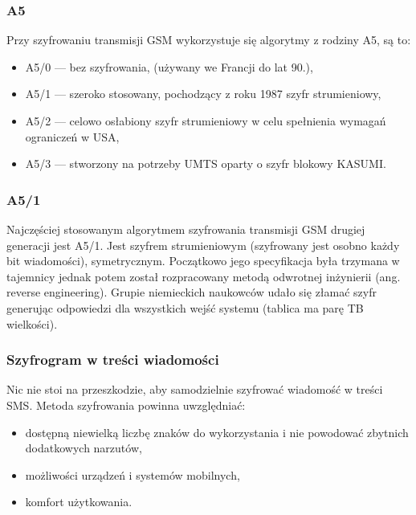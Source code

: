 \documentclass[xcolor=table]{beamer}
\begin{document}
\begin{frame}
  \frametitle{A5}
 Przy szyfrowaniu transmisji GSM wykorzystuje się algorytmy z rodziny A5, są to:
\begin{itemize}
\item A5/0 — bez szyfrowania, (używany we Francji do lat 90.),
\item A5/1 — szeroko stosowany, pochodzący z roku 1987 szyfr strumieniowy,
\item A5/2 — celowo osłabiony szyfr strumieniowy w celu spełnienia wymagań ograniczeń w USA,
\item A5/3 — stworzony na potrzeby UMTS oparty o szyfr blokowy KASUMI.
\end{itemize}

\end{frame}

\begin{frame}
  \frametitle{A5/1}
Najczęściej stosowanym algorytmem szyfrowania transmisji GSM drugiej generacji jest A5/1. Jest szyfrem strumieniowym (szyfrowany jest osobno każdy bit wiadomości),  symetrycznym. Początkowo jego specyfikacja była trzymana w tajemnicy jednak potem został rozpracowany metodą odwrotnej inżynierii (ang. reverse engineering). \newline
\newline
Grupie niemieckich naukowców udało się złamać szyfr generując odpowiedzi dla wszystkich wejść systemu (tablica ma parę TB wielkości).

\end{frame}

\begin{frame}
  \frametitle{Szyfrogram w treści wiadomości}
Nic nie stoi na przeszkodzie, aby samodzielnie szyfrować wiadomość w treści SMS. \newline 
\newline
Metoda szyfrowania powinna uwzględniać:
\begin{itemize}
\item dostępną niewielką liczbę znaków do wykorzystania i nie powodować zbytnich dodatkowych narzutów,
\item możliwości urządzeń i systemów mobilnych,
\item komfort użytkowania.
\end{itemize}

\end{frame}

\end{document}
